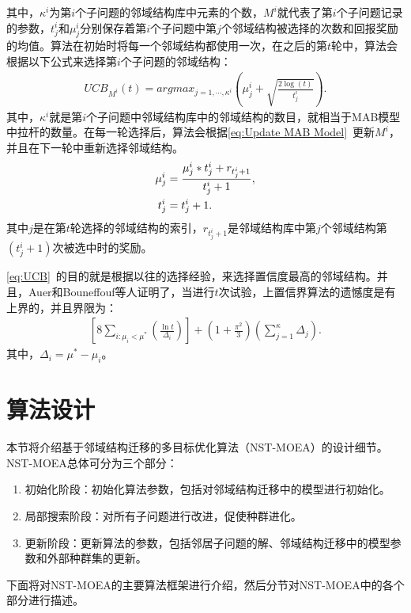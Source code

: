 其中，$\kappa^i$为第$i$个子问题的邻域结构库中元素的个数，$M^i$就代表了第$i$个子问题记录的参数，$t^i_j$和$\mu^i_j$分别保存着第$i$个子问题中第$j$个邻域结构被选择的次数和回报奖励的均值。算法在初始时将每一个邻域结构都使用一次，在之后的第$t$轮中，算法会根据以下公式来选择第$i$个子问题的邻域结构：
\begin{align}
    \label{eq:UCB}
    UCB_{M^i}(t) = argmax_{j=1,\cdots,\kappa^i}(\mu^i_j + \sqrt{\frac{2\log(t)}{t^i_j}}).
\end{align}
其中，$\kappa^i$就是第$i$个子问题中邻域结构库中的邻域结构的数目，就相当于MAB模型中拉杆的数量。在每一轮选择后，算法会根据\autoref{eq:Update MAB Model}~更新$M^i$，并且在下一轮中重新选择邻域结构。
\begin{align} \label{eq:Update MAB Model}
    \mu^i_j &= \frac{\mu^i_j*t^i_j+r_{t^i_j+1}}{t^i_j+1}, \\
    t^i_j &= t^i_j + 1. \notag
\end{align}
其中$j$是在第$t$轮选择的邻域结构的索引，$r_{t^i_j+1}$是邻域结构库中第$j$个邻域结构第$(t^i_j+1)$次被选中时的奖励。
\par
\autoref{eq:UCB}~的目的就是根据以往的选择经验，来选择置信度最高的邻域结构。并且，Auer\cite{auer2002using}和Bouneffouf等人\cite{bouneffouf2016multi}证明了，当进行$t$次试验，上置信界算法的遗憾度是有上界的，并且界限为：
\begin{align}
    \label{eq:Regret Bound}
    [8\sum_{i:\mu_i < \mu^*} (\frac{\ln t}{\Delta_i})] + (1 + \frac{\pi^2}{3})(\sum_{j=1}^{\kappa} \Delta_j).
\end{align}
其中，$\Delta_i = \mu^* - \mu_i$。

\section{算法设计}
\label{sec:NST:算法设计}
本节将介绍基于邻域结构迁移的多目标优化算法（NST-MOEA）的设计细节。NST-MOEA总体可分为三个部分：
\begin{enumerate}
    \item 初始化阶段：初始化算法参数，包括对邻域结构迁移中的模型进行初始化。
    \item 局部搜索阶段：对所有子问题进行改进，促使种群进化。
    \item 更新阶段：更新算法的参数，包括邻居子问题的解、邻域结构迁移中的模型参数和外部种群集的更新。
\end{enumerate}
下面将对NST-MOEA的主要算法框架进行介绍，然后分节对NST-MOEA中的各个部分进行描述。

